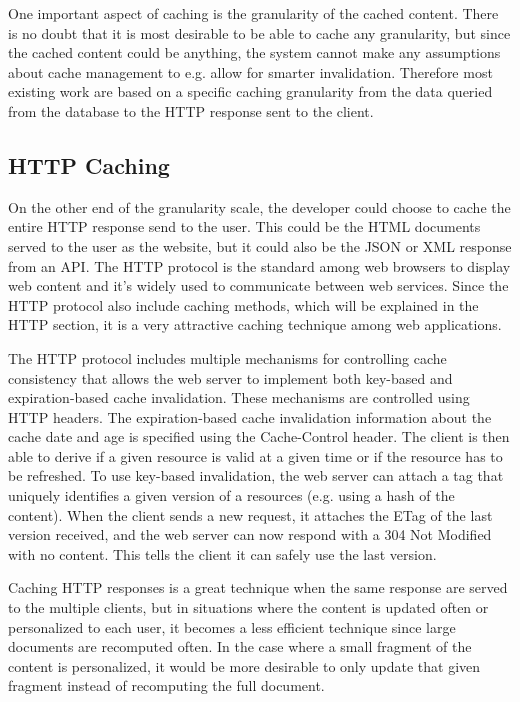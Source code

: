 
One important aspect of caching is the granularity of the cached content. There is no doubt that it is most desirable to be able to cache any granularity, but since the cached content could be anything, the system cannot make any assumptions about cache management to e.g. allow for smarter invalidation. Therefore most existing work are based on a specific caching granularity from the data queried from the database to the HTTP response sent to the client.

\subsection{HTTP Caching}
\label{subsec:http_caching}

On the other end of the granularity scale, the developer could choose to cache the entire HTTP response send to the user. This could be the HTML documents served to the user as the website, but it could also be the JSON or XML response from an API. The HTTP protocol is the standard among web browsers to display web content and it’s widely used to communicate between web services. Since the HTTP protocol also include caching methods, which will be explained in the HTTP section, it is a very attractive caching technique among web applications.

The HTTP protocol includes multiple mechanisms for controlling cache consistency that allows the web server to implement both key-based and expiration-based cache invalidation. These mechanisms are controlled using HTTP headers. The expiration-based cache invalidation information about the cache date and age is specified using the Cache-Control header. The client is then able to derive if a given resource is valid at a given time or if the resource has to be refreshed. To use key-based invalidation, the web server can attach a tag that uniquely identifies a given version of a resources (e.g. using a hash of the content). When the client sends a new request, it attaches the ETag of the last version received, and the web server can now respond with a 304 Not Modified with no content. This tells the client it can safely use the last version.

Caching HTTP responses is a great technique when the same response are served to the multiple clients, but in situations where the content is updated often or personalized to each user, it becomes a less efficient technique since large documents are recomputed often. In the case where a small fragment of the content is personalized, it would be more desirable to only update that given fragment instead of recomputing the full document.

